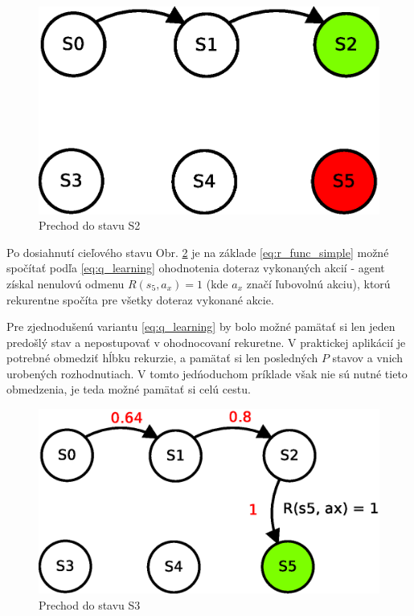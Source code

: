 \begin{figure}[!htb]
\center
\includegraphics[scale=.6]{../diagrams/q_learning_table_03.eps}
\caption{Prechod do stavu S2}
\label{img:q_learning_3}
\end{figure}

Po dosiahnutí cieľového stavu Obr. \ref{img:q_learning_4} je na základe \ref{eq:r_func_simple}
možné spočítať podľa \ref{eq:q_learning} ohodnotenia doteraz vykonaných akcií -
agent získal nenulovú odmenu $R(s_5, a_x) = 1$ (kde $a_x$ značí ľubovolnú akciu),
ktorú rekurentne spočíta pre všetky doteraz vykonané akcie.

Pre zjednodušenú variantu \ref{eq:q_learning} by bolo možné pamätať si len jeden
predošlý stav a nepostupovať v ohodnocovaní rekuretne. V praktickej aplikácií
je potrebné obmedziť hĺbku rekurzie, a pamätať si len posledných $P$ stavov a vnich
urobených rozhodnutiach. V tomto jedńoduchom príklade však nie sú nutné tieto obmedzenia, je teda
možné pamätať si celú cestu.

\begin{figure}[!htb]
\center
\includegraphics[scale=.6]{../diagrams/q_learning_table_04.eps}
\caption{Prechod do stavu S3}
\label{img:q_learning_4}
\end{figure}

